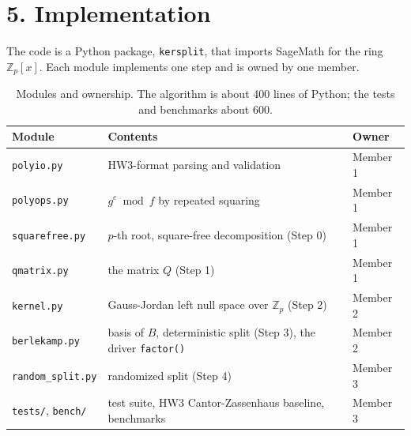 \documentclass[11pt,a4paper]{article}
\newcommand{\Zp}{\mathbb{Z}_p}
\newcommand{\Zpx}{\mathbb{Z}_p[x]}
\begin{document}
\section*{5. Implementation}

The code is a Python package, \texttt{kersplit}, that imports SageMath for the ring $\Zpx$. Each
module implements one step and is owned by one member.

\begin{table}[H]
\centering
\small
\begin{tabular}{lll}
\toprule
Module & Contents & Owner \\
\midrule
\texttt{polyio.py} & HW3-format parsing and validation & Member 1 \\
\texttt{polyops.py} & $g^e \bmod f$ by repeated squaring & Member 1 \\
\texttt{squarefree.py} & $p$-th root, square-free decomposition (Step 0) & Member 1 \\
\texttt{qmatrix.py} & the matrix $Q$ (Step 1) & Member 1 \\
\texttt{kernel.py} & Gauss-Jordan left null space over $\Zp$ (Step 2) & Member 2 \\
\texttt{berlekamp.py} & basis of $B$, deterministic split (Step 3), the driver \texttt{factor()} & Member 2 \\
\texttt{random\_split.py} & randomized split (Step 4) & Member 3 \\
\texttt{tests/}, \texttt{bench/} & test suite, HW3 Cantor-Zassenhaus baseline, benchmarks & Member 3 \\
\bottomrule
\end{tabular}
\caption{Modules and ownership. The algorithm is about 400 lines of Python; the tests and benchmarks about 600.}
\end{table}
\end{document}

